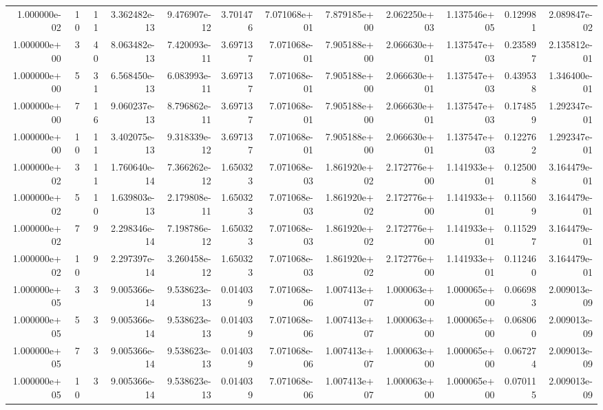 \begin{tabular}{rrrrrrrrrrrr}
1.000000e-02 & 10 & 11 & 3.362482e-13 &   9.476907e-12 &      3.701476 &  7.071068e+01 & 7.879185e+00 &      2.062250e+03 &   1.137546e+05 &   0.129981 & 2.089847e-02 \\
1.000000e+00 &  3 & 40 & 8.063482e-13 &   7.420093e-11 &      3.697137 &  7.071068e-01 & 7.905188e+00 &      2.066630e+01 &   1.137547e+03 &   0.235897 & 2.135812e-01 \\
1.000000e+00 &  5 & 31 & 6.568450e-13 &   6.083993e-11 &      3.697137 &  7.071068e-01 & 7.905188e+00 &      2.066630e+01 &   1.137547e+03 &   0.439538 & 1.346400e-01 \\
1.000000e+00 &  7 & 16 & 9.060237e-13 &   8.796862e-11 &      3.697137 &  7.071068e-01 & 7.905188e+00 &      2.066630e+01 &   1.137547e+03 &   0.174859 & 1.292347e-01 \\
1.000000e+00 & 10 & 11 & 3.402075e-13 &   9.318339e-12 &      3.697137 &  7.071068e-01 & 7.905188e+00 &      2.066630e+01 &   1.137547e+03 &   0.122762 & 1.292347e-01 \\
1.000000e+02 &  3 & 11 & 1.760640e-14 &   7.366262e-12 &      1.650323 &  7.071068e-03 & 1.861920e+02 &      2.172776e+00 &   1.141933e+01 &   0.125008 & 3.164479e-01 \\
1.000000e+02 &  5 & 10 & 1.639803e-13 &   2.179808e-11 &      1.650323 &  7.071068e-03 & 1.861920e+02 &      2.172776e+00 &   1.141933e+01 &   0.115609 & 3.164479e-01 \\
1.000000e+02 &  7 &  9 & 2.298346e-14 &   7.198786e-12 &      1.650323 &  7.071068e-03 & 1.861920e+02 &      2.172776e+00 &   1.141933e+01 &   0.115297 & 3.164479e-01 \\
1.000000e+02 & 10 &  9 & 2.297397e-14 &   3.260458e-12 &      1.650323 &  7.071068e-03 & 1.861920e+02 &      2.172776e+00 &   1.141933e+01 &   0.112460 & 3.164479e-01 \\
1.000000e+05 &  3 &  3 & 9.005366e-14 &   9.538623e-13 &      0.014039 &  7.071068e-06 & 1.007413e+07 &      1.000063e+00 &   1.000065e+00 &   0.066983 & 2.009013e-09 \\
1.000000e+05 &  5 &  3 & 9.005366e-14 &   9.538623e-13 &      0.014039 &  7.071068e-06 & 1.007413e+07 &      1.000063e+00 &   1.000065e+00 &   0.068060 & 2.009013e-09 \\
1.000000e+05 &  7 &  3 & 9.005366e-14 &   9.538623e-13 &      0.014039 &  7.071068e-06 & 1.007413e+07 &      1.000063e+00 &   1.000065e+00 &   0.067274 & 2.009013e-09 \\
1.000000e+05 & 10 &  3 & 9.005366e-14 &   9.538623e-13 &      0.014039 &  7.071068e-06 & 1.007413e+07 &      1.000063e+00 &   1.000065e+00 &   0.070115 & 2.009013e-09 \\
\bottomrule
\end{tabular}
